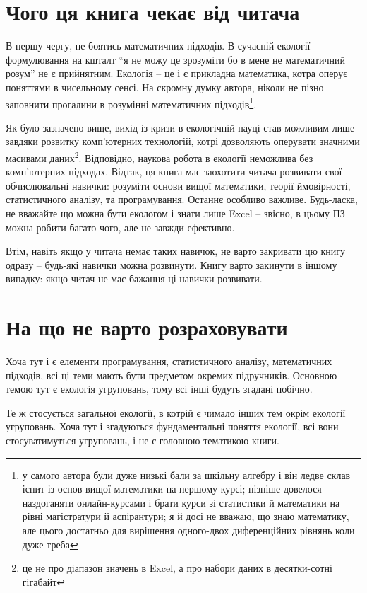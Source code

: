 \documentclass[
  11pt,
]{book}
\begin{document}
\section{Чого ця книга чекає від читача}\label{expected}

В першу чергу, не боятись математичних підходів. В сучасній екології формулювання на кшталт ``я не можу це зрозуміти бо в мене не математичний розум'' не є прийнятним. Екологія -- це і є прикладна математика, котра оперує поняттями в чисельному сенсі. На скромну думку автора, ніколи не пізно заповнити прогалини в розумінні математичних підходів\footnote{у самого автора були дуже низькі бали за шкільну алгебру і він ледве склав іспит із основ вищої математики на першому курсі; пізніше довелося наздоганяти онлайн-курсами і брати курси зі статистики й математики на рівні магістратури й аспірантури; я й досі не вважаю, що знаю математику, але цього достатньо для вирішення одного-двох диференційних рівнянь коли дуже треба}.

Як було зазначено вище, вихід із кризи в екологічній науці став можливим лише завдяки розвитку комп'ютерних технологій, котрі дозволяють оперувати значними масивами даних\footnote{це не про діапазон значень в Excel, а про набори даних в десятки-сотні гігабайт}. Відповідно, наукова робота в екології неможлива без комп'ютерних підходах. Відтак, ця книга має заохотити читача розвивати свої обчислювальні навички: розуміти основи вищої математики, теорії ймовірності, статистичного аналізу, та програмування. Останнє особливо важливе. Будь-ласка, не вважайте що можна бути екологом і знати лише Excel -- звісно, в цьому ПЗ можна робити багато чого, але не завжди ефективно.

Втім, навіть якщо у читача немає таких навичок, не варто закривати цю книгу одразу -- будь-які навички можна розвинути. Книгу варто закинути в іншому випадку: якщо читач не має бажання ці навички розвивати.

\section{На що не варто розраховувати}\label{notexpect}

Хоча тут і є елементи програмування, статистичного аналізу, математичних підходів, всі ці теми мають бути предметом окремих підручників. Основною темою тут є екологія угруповань, тому всі інші будуть згадані побічно.

Те ж стосується загальної екології, в котрій є чимало інших тем окрім екології угруповань. Хоча тут і згадуються фундаментальні поняття екології, всі вони стосуватимуться угруповань, і не є головною тематикою книги.
\end{document}
